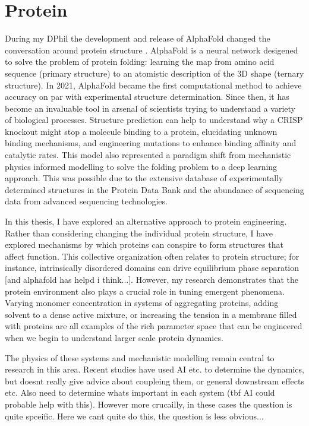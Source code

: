 \section{Protein }
During my DPhil the development and release of AlphaFold changed the conversation around protein structure . AlphaFold is a neural network desigened to solve the problem of protein folding: learning the map from amino acid sequence (primary structure) to an atomistic description of the 3D shape (ternary structure). In 2021, AlphaFold became the first computational method to achieve accuracy on par with experimental structure determination. Since then, it has become an invaluable tool in arsenal of scientists trying to understand a variety of biological processes. Structure prediction can help to understand why a CRISP knockout might stop a molecule binding to a protein, elucidating unknown binding mechanisms, and engineering mutations to enhance binding affinity and catalytic rates. This model also represented a paradigm shift from mechanistic physics informed modelling to solve the folding problem to a deep learning approach. This was possible due to the extensive database of experimentally determined structures in the Protein Data Bank and the abundance of sequencing data from advanced sequencing technologies.

In this thesis, I have explored an alternative approach to protein engineering. Rather than considering changing the individual protein structure, I have explored mechanisms by which proteins can conspire to form structures that affect function. This collective organization often relates to protein structure; for instance, intrinsically disordered domains can drive equilibrium phase separation [and alphafold has helpd i think...]. However, my research demonstrates that the protein environment also plays a crucial role in tuning emergent phenomena. Varying monomer concentration in systems of aggregating proteins, adding solvent to a dense active mixture, or increasing the tension in a membrane filled with proteins are all examples of the rich parameter space that can be engineered when we begin to understand larger scale protein dynamics. 

The physics of these systems and mechanistic modelling remain central to research in this area. Recent studies have used AI etc. to determine the dynamics, but doesnt really give advice about coupleing them, or general downstream effects etc. Also need to determine whats important in each system (tbf AI could probable help with this). However more crucailly, in these cases the question is quite spceific. Here we cant quite do this, the question is less obvious...

